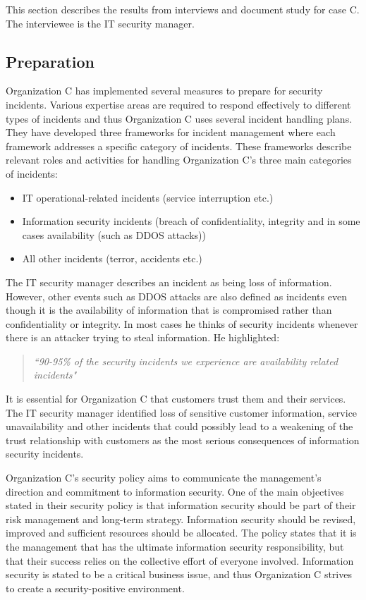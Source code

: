 This section describes the results from interviews and document study for case C. The interviewee is the IT security manager. 

\subsection{Preparation}
Organization C has implemented several measures to prepare for security incidents. Various expertise areas are required to respond effectively to different types of incidents and thus Organization C uses several incident handling plans. They have developed three frameworks for incident management where each framework addresses a specific category of incidents. These frameworks describe relevant roles and activities for handling Organization C's three main categories of incidents:

\begin{itemize}
\item IT operational-related incidents (service interruption etc.)
\item Information security incidents (breach of confidentiality, integrity and in some cases availability (such as DDOS attacks))
\item All other incidents (terror, accidents etc.)
\end{itemize}
 
The IT security manager describes an incident as being loss of information. However, other events such as DDOS attacks are also defined as incidents even though it is the availability of information that is compromised rather than confidentiality or integrity. In most cases he thinks of security incidents whenever there is an attacker trying to steal information. He highlighted:

\begin{quote}
\textit{``90-95\% of the security incidents we experience are availability related incidents"}
\end{quote} 
 
It is essential for Organization C that customers trust them and their services. The IT security manager identified loss of sensitive customer information, service unavailability and other incidents that could possibly lead to a weakening of the trust relationship with customers as the most serious consequences of information security incidents. 

Organization C's security policy aims to communicate the management's direction and commitment to information security. One of the main objectives stated in their security policy is that information security should be part of their risk management and long-term strategy. Information security should be revised, improved and sufficient resources should be allocated. The policy states that it is the management that has the ultimate information security responsibility, but that their success relies on the collective effort of everyone involved. Information security is stated to be a critical business issue, and thus Organization C strives to create a security-positive environment.

